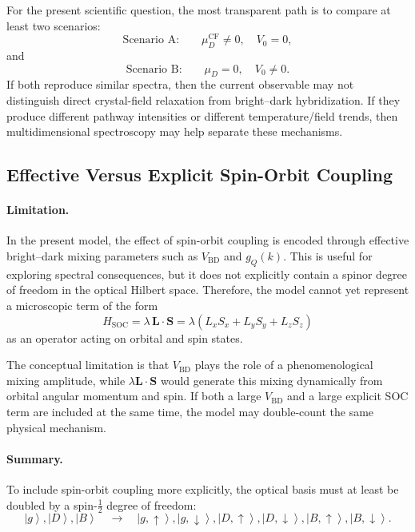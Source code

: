 \documentclass[11pt]{article}
\newcommand{\ket}[1]{\left|#1\right\rangle}
\begin{document}
For the present scientific question, the most transparent path is to compare at least two scenarios:
\begin{equation}
\text{Scenario A:}\qquad \mu_D^{\mathrm{CF}}\neq0,\quad V_0=0,
\end{equation}
and
\begin{equation}
\text{Scenario B:}\qquad \mu_D=0,\quad V_0\neq0.
\end{equation}
If both reproduce similar spectra, then the current observable may not distinguish direct crystal-field relaxation from bright--dark hybridization. If they produce different pathway intensities or different temperature/field trends, then multidimensional spectroscopy may help separate these mechanisms.

\subsection{Effective Versus Explicit Spin-Orbit Coupling}

\paragraph{Limitation.}

In the present model, the effect of spin-orbit coupling is encoded through effective bright--dark mixing parameters such as \(V_{\mathrm{BD}}\) and \(g_Q(k)\). This is useful for exploring spectral consequences, but it does not explicitly contain a spinor degree of freedom in the optical Hilbert space. Therefore, the model cannot yet represent a microscopic term of the form
\begin{equation}
H_{\mathrm{SOC}}
=
\lambda\,\bm{L}\cdot\bm{S}
=
\lambda
\left(
L_xS_x+L_yS_y+L_zS_z
\right)
\end{equation}
as an operator acting on orbital and spin states.

The conceptual limitation is that \(V_{\mathrm{BD}}\) plays the role of a phenomenological mixing amplitude, while \(\lambda\bm{L}\cdot\bm{S}\) would generate this mixing dynamically from orbital angular momentum and spin. If both a large \(V_{\mathrm{BD}}\) and a large explicit SOC term are included at the same time, the model may double-count the same physical mechanism.

\paragraph{Summary.}

To include spin-orbit coupling more explicitly, the optical basis must at least be doubled by a spin-\(\frac12\) degree of freedom:
\begin{equation}
\ket{g},\ket{D},\ket{B}
\quad
\longrightarrow
\quad
\ket{g,\uparrow},\ket{g,\downarrow},
\ket{D,\uparrow},\ket{D,\downarrow},
\ket{B,\uparrow},\ket{B,\downarrow}.
\end{equation}
\end{document}
